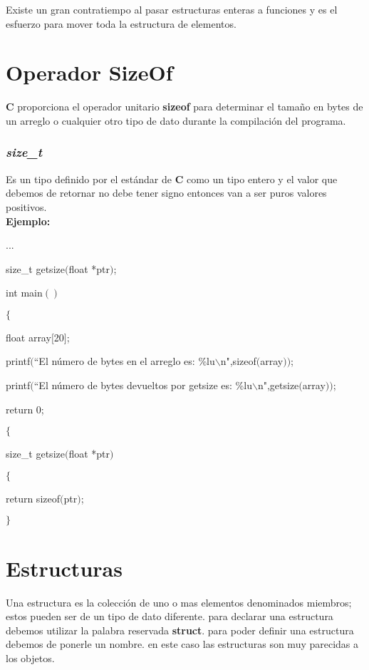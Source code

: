 \documentclass[]{article}
\begin{document}
				Existe un gran contratiempo al pasar estructuras enteras a funciones y es el esfuerzo para mover toda la estructura de elementos. 
			
				
			
	
	\section{Operador SizeOf}
	
	\textbf{C} proporciona el operador unitario \textbf{sizeof} para determinar el tamaño en bytes de un arreglo o cualquier otro tipo de dato durante la compilación del programa.
	
	\subsubsection{\textit{size\_t}}
	
	Es un tipo definido por el estándar de \textbf{C} como un tipo entero y el valor que debemos de retornar no debe tener signo entonces van a ser puros valores positivos.\\
	
	\textbf{Ejemplo:\\}
	
	...
	
	size\_t getsize$($float *ptr$)$;
	
	int main$()$
	
	$\lbrace$
	
	float array$\lbrack$20$\rbrack$;
	
	printf$($``El número de bytes en el arreglo es: \%lu$\backslash$n",sizeof$($array$))$;
	
	printf$($``El número de bytes devueltos por getsize es: \%lu$\backslash$n",getsize$($array$))$;
	
	return 0;
	
	$\lbrace$
	
	size\_t getsize$($float *ptr$)$
	
	$\lbrace$
	
	return sizeof$($ptr$)$;
	
	$\rbrace$
	
	\section{Estructuras}
	
	Una estructura es la colección de uno o mas elementos denominados miembros; estos pueden ser de un tipo de dato diferente. para declarar una estructura debemos utilizar la palabra reservada \textbf{struct}. para poder definir una estructura debemos de ponerle un nombre. en este caso las estructuras son muy parecidas a los objetos.\\
	
\end{document}
